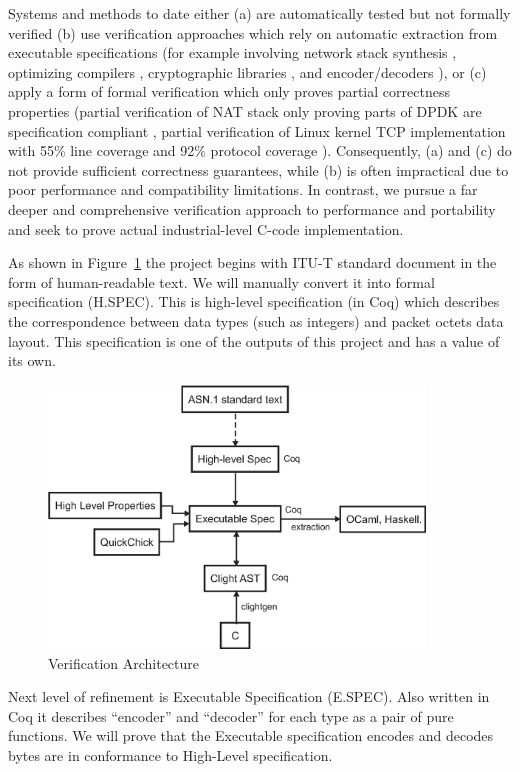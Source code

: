 \documentclass[acmsmall,nonacm]{acmart}
\begin{document}
Systems and methods to date either (a) are automatically tested but not
formally verified (b) use verification approaches which rely on
automatic extraction from executable specifications (for example
involving network stack synthesis \cite{VNSSforSel4}, optimizing compilers
\cite{CompCert}, cryptographic libraries \cite{HACL}, and
encoder/decoders \cite{Narcissus}), or (c) apply a form of formal
verification which only proves partial correctness properties (partial
verification of NAT stack only proving parts of DPDK are specification
compliant \cite{NAT}, partial verification of Linux kernel TCP
implementation with 55\% line coverage and 92\% protocol coverage
\cite{NSDI}). Consequently, (a) and (c) do not provide sufficient
correctness guarantees, while (b) is often impractical due to poor
performance and compatibility limitations. In contrast, we pursue a
far deeper and comprehensive verification approach to performance and
portability and seek to prove actual industrial-level C-code
implementation.

As shown in Figure~\ref{fig:components} the project begins with ITU-T
standard document in the form of human-readable text. We will manually
convert it into formal specification (H.SPEC). This is high-level
specification (in Coq) which describes the correspondence between data
types (such as integers) and packet octets data layout. This
specification is one of the outputs of this project and has a value of
its own.

\begin{figure}[h!]
  \centering
  \includegraphics[width=10cm]{VerificationArchitectureDiagram.eps}
  \caption{Verification Architecture}
  \label{fig:components}
\end{figure}

Next level of refinement is Executable Specification (E.SPEC). Also
written in Coq it describes ``encoder'' and ``decoder'' for each type
as a pair of pure functions. We will prove that the Executable
specification encodes and decodes bytes are in conformance to High-Level
specification.
\end{document}
